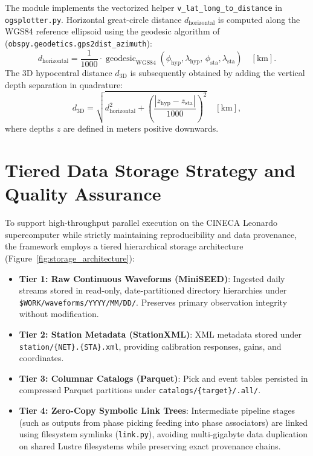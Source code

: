 The module implements the vectorized helper \texttt{v\_lat_long_to_distance} in \texttt{ogsplotter.py}. Horizontal great-circle distance $d_{\mathrm{horizontal}}$ is computed along the WGS84 reference ellipsoid using the geodesic algorithm of \textcite{ObsPy} (\texttt{obspy.geodetics.gps2dist_azimuth}):
\begin{equation}
  d_{\mathrm{horizontal}} = \frac{1}{1000} \cdot \operatorname{geodesic}_{\mathrm{WGS84}}\left(\phi_{\mathrm{hyp}}, \lambda_{\mathrm{hyp}},\, \phi_{\mathrm{sta}}, \lambda_{\mathrm{sta}}\right) \quad [\unit{\kilo\meter}].
  \label{eq:horizontal_distance}
\end{equation}
The 3D hypocentral distance $d_{3\mathrm{D}}$ is subsequently obtained by adding the vertical depth separation in quadrature:
\begin{equation}
  d_{3\mathrm{D}} = \sqrt{d_{\mathrm{horizontal}}^2 + \left(\frac{|z_{\mathrm{hyp}} - z_{\mathrm{sta}}|}{1000}\right)^2} \quad [\unit{\kilo\meter}],
  \label{eq:hypocentral_distance}
\end{equation}
where depths $z$ are defined in meters positive downwards.

\section{Tiered Data Storage Strategy and Quality Assurance}
\label{sec:storage_strategy}

To support high-throughput parallel execution on the CINECA Leonardo supercomputer while strictly maintaining reproducibility and data provenance, the framework employs a tiered hierarchical storage architecture (Figure~\ref{fig:storage_architecture}):
\begin{itemize}
  \item \textbf{Tier 1: Raw Continuous Waveforms (MiniSEED)}: Ingested daily streams stored in read-only, date-partitioned directory hierarchies under \texttt{\$WORK/waveforms/YYYY/MM/DD/}. Preserves primary observation integrity without modification.
  \item \textbf{Tier 2: Station Metadata (StationXML)}: XML metadata stored under \texttt{station/\{NET\}.\{STA\}.xml}, providing calibration responses, gains, and coordinates.
  \item \textbf{Tier 3: Columnar Catalogs (Parquet)}: Pick and event tables persisted in compressed Parquet partitions under \texttt{catalogs/\{target\}/.all/}.
  \item \textbf{Tier 4: Zero-Copy Symbolic Link Trees}: Intermediate pipeline stages (such as outputs from phase picking feeding into phase associators) are linked using filesystem symlinks (\texttt{link.py}), avoiding multi-gigabyte data duplication on shared Lustre filesystems while preserving exact provenance chains.
\end{itemize}

